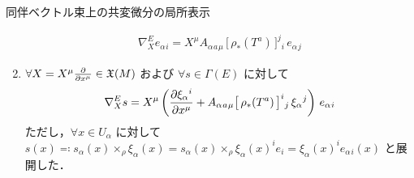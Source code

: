 \documentclass[geometry_main]{subfiles}
\begin{document}
\begin{mytheo}[label=thm:codv-assoc-local,breakable]{同伴ベクトル束上の共変微分の局所表示}
\begin{enumerate}
        \begin{align}
            \nabla^E_X e_{\alpha}{}_i = X^\mu A_\alpha{}_a{}_\mu\, \bigl[\, \rho_*(T^a) \,\bigr]^j{}_i\, e_{\alpha}{}_j
        \end{align}
        \item $\forall X = X^\mu \pdv{}{x^\mu} \in \mathfrak{X}(M)$ および $\forall s \in \Gamma(E)$ に対して
        \begin{align}
            \nabla^E_X s = X^\mu \left( \pdv{\xi_\alpha{}^i}{x^\mu} + A_\alpha{}_a{}_\mu \bigl[ \,\rho_*(T^a) \,\bigr]^i{}_j\, \xi_\alpha{}^j  \right) \, e_{\alpha}{}_i
        \end{align}
        ただし，$\forall x \in U_\alpha$ に対して $s(x) \eqqcolon s_\alpha(x) \times_\rho \xi_\alpha (x) = s_\alpha(x) \times_\rho \xi_\alpha(x)^i e_i = \xi_\alpha(x)^i e_{\alpha}{}_i(x)$ と展開した．
    \end{enumerate}
\end{mytheo}
\end{document}
